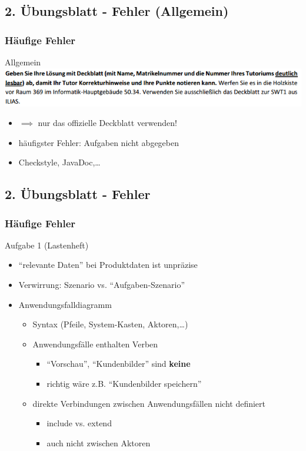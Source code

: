 \documentclass[18pt]{beamer}
\begin{document}
\subsection{2. Übungsblatt - Fehler (Allgemein)}
\begin{frame}
		\frametitle{Häufige Fehler}
		\begin{block}{Allgemein}
			\includegraphics[scale=0.6]{./pics/tut2/deckblatt.png}
			\begin{itemize}
				\item $\implies$ nur das offizielle Deckblatt verwenden!
				\pause
				\item häufigster Fehler: Aufgaben nicht abgegeben
				\item Checkstyle, JavaDoc,\dots
			\end{itemize}
		\end{block}
\end{frame}
	
\subsection{2. Übungsblatt - Fehler}
\begin{frame}
		\frametitle{Häufige Fehler}
		\begin{block}{Aufgabe 1 (Lastenheft)}
			\begin{itemize}
				\item \enquote{relevante Daten} bei Produktdaten ist unpräzise
				\pause
				\item Verwirrung: Szenario vs. \enquote{Aufgaben-Szenario}
				\pause
				\item Anwendungsfalldiagramm
				\begin{itemize}
					\item Syntax (Pfeile, System-Kasten, Aktoren,\dots)
					\item Anwendungsfälle enthalten Verben
					\begin{itemize}
						\item \enquote{Vorschau}, \enquote{Kundenbilder} sind \textbf{keine}
						\item richtig wäre z.B. \enquote{Kundenbilder speichern}
					\end{itemize}
					\item direkte Verbindungen zwischen Anwendungsfällen nicht definiert
					\begin{itemize}
						\item include vs. extend
						\item auch nicht zwischen Aktoren
					\end{itemize}
				\end{itemize}
			\end{itemize}
		\end{block}
\end{frame}
\end{document}
